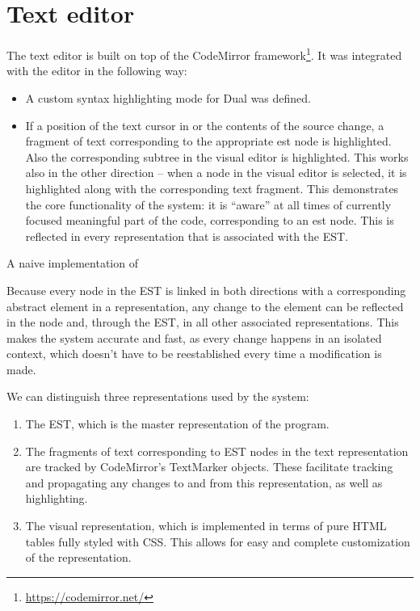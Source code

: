 \section{Text editor}
The text editor is built on top of the CodeMirror framework\footnote{\url{https://codemirror.net/}}. It was integrated with the editor in the following way:
\begin{itemize}
    \item A custom syntax highlighting mode for Dual was defined.
    \item If a position of the text cursor in or the contents of the source change, a fragment of text corresponding to the appropriate \acrshort{est} node is highlighted. Also the corresponding subtree in the visual editor is highlighted. This works also in the other direction -- when a node in the visual editor is selected, it is highlighted along with the corresponding text fragment. This demonstrates the core functionality of the system: it is ``aware'' at all times of currently focused meaningful part of the code, corresponding to an \acrshort{est} node. This is reflected in every representation that is associated with the EST.

\end{itemize}
A naive implementation of 

Because every node in the EST is linked in both directions with a corresponding abstract element in a representation, any change to the element can be reflected in the node and, through the EST, in all other associated representations. This makes the system accurate and fast, as every change happens in an isolated context, which doesn't have to be reestablished every time a modification is made.

We can distinguish three representations used by the system:
\begin{enumerate}
    \item The EST, which is the master representation of the program.
    \item The fragments of text corresponding to EST nodes in the text representation are tracked by CodeMirror's TextMarker objects. These facilitate tracking and propagating any changes to and from this representation, as well as highlighting.
    \item The visual representation, which is implemented in terms of pure HTML tables fully styled with CSS. This allows for easy and complete customization of the representation.
\end{enumerate}

